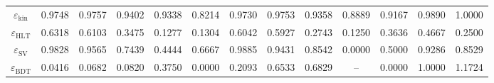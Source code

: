 \documentclass[10pt,a4paper]{article}
\begin{document}
\begin{landscape}
{\begin{tabular}{c|cccc|cccc|cccc}
\midrule
$\varepsilon_{\mathrm{kin}}$ & 0.9748 & 0.9757 & 0.9402 & 0.9338 & 0.8214 & 0.9730 & 0.9753 & 0.9358 & 0.8889 & 0.9167 & 0.9890 & 1.0000\\
$\varepsilon_{\mathrm{HLT}}$ & 0.6318 & 0.6103 & 0.3475 & 0.1277 & 0.1304 & 0.6042 & 0.5927 & 0.2743 & 0.1250 & 0.3636 & 0.4667 & 0.2500\\
$\varepsilon_{\mathrm{SV}}$ & 0.9828 & 0.9565 & 0.7439 & 0.4444 & 0.6667 & 0.9885 & 0.9431 & 0.8542 & 0.0000 & 0.5000 & 0.9286 & 0.8529\\
$\varepsilon_{\mathrm{BDT}}$ & 0.0416 & 0.0682 & 0.0820 & 0.3750 & 0.0000 & 0.2093 & 0.6533 & 0.6829 & -- & 0.0000 & 1.0000 & 1.1724\\
\bottomrule
\end{tabular}}

\end{landscape}
\clearpage
\end{document}
